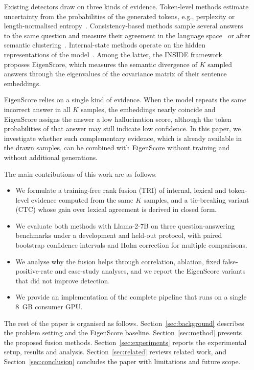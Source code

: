 \documentclass[conference]{IEEEtran}
\begin{document}
Existing detectors draw on three kinds of evidence. Token-level methods estimate uncertainty from the probabilities of the generated tokens, e.g., perplexity or length-normalised entropy~\cite{malinin2021}. Consistency-based methods sample several answers to the same question and measure their agreement in the language space~\cite{lin2023generating,manakul2023} or after semantic clustering~\cite{kuhn2023,farquhar2024}. Internal-state methods operate on the hidden representations of the model~\cite{chen2024inside,sriramanan2024}. Among the latter, the INSIDE framework~\cite{chen2024inside} proposes EigenScore, which measures the semantic divergence of $K$ sampled answers through the eigenvalues of the covariance matrix of their sentence embeddings.

EigenScore relies on a single kind of evidence. When the model repeats the same incorrect answer in all $K$ samples, the embeddings nearly coincide and EigenScore assigns the answer a low hallucination score, although the token probabilities of that answer may still indicate low confidence. In this paper, we investigate whether such complementary evidence, which is already available in the drawn samples, can be combined with EigenScore without training and without additional generations.

The main contributions of this work are as follows:
\begin{itemize}
\item We formulate a training-free rank fusion (TRI) of internal, lexical and token-level evidence computed from the same $K$ samples, and a tie-breaking variant (CTC) whose gain over lexical agreement is derived in closed form.
\item We evaluate both methods with Llama-2-7B on three question-answering benchmarks under a development and held-out protocol, with paired bootstrap confidence intervals and Holm correction for multiple comparisons.
\item We analyse why the fusion helps through correlation, ablation, fixed false-positive-rate and case-study analyses, and we report the EigenScore variants that did not improve detection.
\item We provide an implementation of the complete pipeline that runs on a single 8~GB consumer GPU.
\end{itemize}

The rest of the paper is organised as follows. Section~\ref{sec:background} describes the problem setting and the EigenScore baseline. Section~\ref{sec:method} presents the proposed fusion methods. Section~\ref{sec:experiments} reports the experimental setup, results and analysis. Section~\ref{sec:related} reviews related work, and Section~\ref{sec:conclusion} concludes the paper with limitations and future scope.
\end{document}
